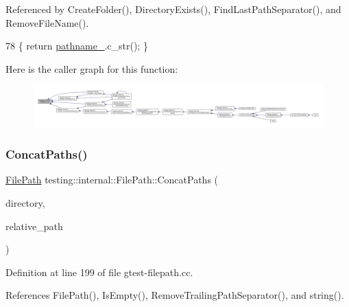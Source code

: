 Referenced by Create\+Folder(), Directory\+Exists(), Find\+Last\+Path\+Separator(), and Remove\+File\+Name().


\begin{DoxyCode}
78 \{ \textcolor{keywordflow}{return} \hyperlink{classtesting_1_1internal_1_1FilePath_a12ce28a0015f85604e0372230fa18d6e}{pathname\_}.c\_str(); \}
\end{DoxyCode}
Here is the caller graph for this function\+:
\nopagebreak
\begin{figure}[H]
\begin{center}
\leavevmode
\includegraphics[width=350pt]{classtesting_1_1internal_1_1FilePath_a43e9ff978b0d7c43c401d976d4621aa3_icgraph}
\end{center}
\end{figure}
\mbox{\label{classtesting_1_1internal_1_1FilePath_ac9d57987f60ac43f0c57b89e333e531e}} 
\subsubsection{\texorpdfstring{Concat\+Paths()}{ConcatPaths()}}
{\footnotesize\ttfamily \hyperlink{classtesting_1_1internal_1_1FilePath}{File\+Path} testing\+::internal\+::\+File\+Path\+::\+Concat\+Paths (\begin{DoxyParamCaption}\item[{const \hyperlink{classtesting_1_1internal_1_1FilePath}{File\+Path} \&}]{directory,  }\item[{const \hyperlink{classtesting_1_1internal_1_1FilePath}{File\+Path} \&}]{relative\+\_\+path }\end{DoxyParamCaption})\hspace{0.3cm}{\ttfamily [static]}}



Definition at line 199 of file gtest-\/filepath.\+cc.



References File\+Path(), Is\+Empty(), Remove\+Trailing\+Path\+Separator(), and string().



